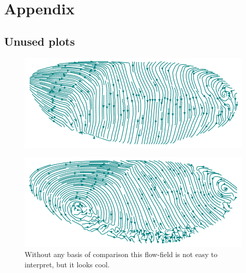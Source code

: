 \chapter{Appendix}

\section{Unused plots}
\label{App:Plots}
\begin{figure}[H]
    \centering
    \includegraphics[width=1\linewidth]{chapters/Appendix/streamplot1.png}
\end{figure}

\begin{figure}[H]
    \centering
    \includegraphics[width=1\linewidth]{chapters/Results/figures/streamplot2.png}
    \caption{
Without any basis of comparison this flow-field is not easy to interpret, but it looks cool.}
    \label{fig:streamplot}
\end{figure}


